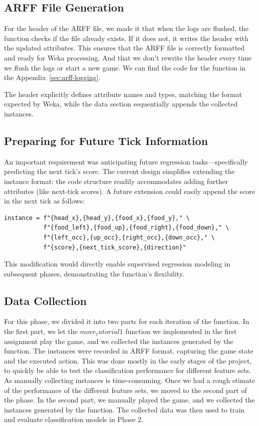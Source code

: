 \documentclass[12pt,a4paper]{article}
\begin{document}
\subsection{ARFF File Generation}

For the header of the ARFF file, we made it that when the logs are flushed, the function checks if the file already exists. If it does not, it writes the header with the updated attributes. This ensures that the ARFF file is correctly formatted and ready for Weka processing.
And that we don't rewrite the header every time we flush the logs or start a new game.
We can find the code for the function in the Appendix~\autoref{sec:arff-logging}.

The header explicitly defines attribute names and types, matching the format expected by Weka, while the data section sequentially appends the collected instances.

\subsection{Preparing for Future Tick Information}

An important requirement was anticipating future regression tasks—specifically predicting the next tick’s score. The current design simplifies extending the instance format: the code structure readily accommodates adding further attributes (like next-tick scores). A future extension could easily append the score in the next tick as follows:

\begin{verbatim}
instance = f"{head_x},{head_y},{food_x},{food_y}," \
           f"{food_left},{food_up},{food_right},{food_down}," \
           f"{left_occ},{up_occ},{right_occ},{down_occ}," \
           f"{score},{next_tick_score},{direction}"
\end{verbatim}

This modification would directly enable supervised regression modeling in subsequent phases, demonstrating the function's flexibility.

\subsection{Data Collection}

For this phase, we divided it into two parts for each iteration of the function. 
In the first part, we let the $move_tutorial1$ function we implemented in the first assignment play the game, 
and we collected the instances generated by the function.
The instances were recorded in ARFF format, capturing the game state and the executed action.
This was done mostly in the early stages of the project, to quickly be able to test the classification performance for different feature sets.
As manually collecting instances is time-consuming.
Once we had a rough stimate of the performance of the different feature sets, we moved to the second part of the phase.
In the second part, we manually played the game, and we collected the instances generated by the function.
The collected data was then used to train and evaluate classification models in Phase 2.
\end{document}
